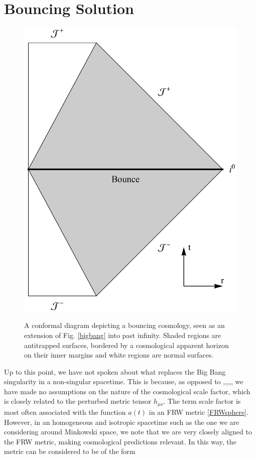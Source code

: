 \section{Bouncing Solution}
\label{sec:Bouncing}
\begin{figure}[h]\cite{Conroy:2014dja}
\centering
\includegraphics[scale=0.3]{bounce2.pdf}
\caption{A conformal diagram depicting a bouncing cosmology, seen as an extension of Fig. \eqref{bigbang} into past infinity. Shaded regions are antitrapped surfaces, bordered by a cosmological apparent horizon on their inner margins and white regions are normal surfaces.} \label{figbounce} 
\end{figure}
Up to this point, we have not spoken about what replaces the Big Bang singularity in a non-singular spacetime. 
This is because, as opposed to \cite{Conroy:2014dja},\cite{Koshelev:2012qn},\cite{Koshelev:2013lfm},\cite{Biswas:2011ar},\cite{Abramo:2009qk}, we have made no assumptions on the nature of the cosmological scale factor, which is closely related to the perturbed metric tensor $h_{\mu\nu}$. The term scale factor is most often associated with the function $a(t)$ in an FRW metric \eqref{FRWsphere}. However, in an homogeneous and isotropic spacetime such as the one we are considering around Minkowski space, we note that we are very closely aligned to the FRW metric, making cosmological predictions relevant. In this way, the metric can be considered to be of the form
